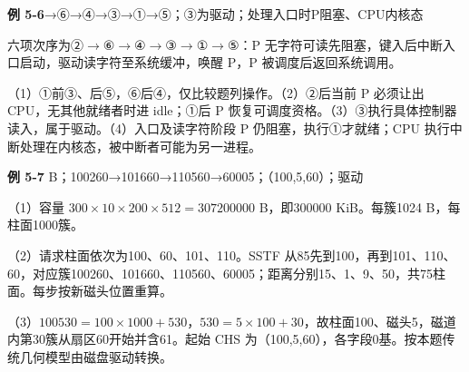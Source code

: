 \documentclass{sidenotes-simplex}
\begin{document}
\par\medskip\Needspace{30.00mm}\noindent{}\label{a:OS05-E06}\textbf{例 5-6}→{\SNsymbolfont ⑥}→{\SNsymbolfont ④}→{\SNsymbolfont ③}→{\SNsymbolfont ①}→{\SNsymbolfont ⑤}；{\SNsymbolfont ③}为驱动；处理入口时P阻塞、CPU内核态
\par\smallskip
六项次序为{\SNsymbolfont ②}\ensuremath{\to}{\SNsymbolfont ⑥}\ensuremath{\to}{\SNsymbolfont ④}\ensuremath{\to}{\SNsymbolfont ③}\ensuremath{\to}{\SNsymbolfont ①}\ensuremath{\to}{\SNsymbolfont ⑤}：P 无字符可读先阻塞，键入后中断入口启动，驱动读字符至系统缓冲，唤醒 P，P 被调度后返回系统调用。

（1）{\SNsymbolfont ①}前{\SNsymbolfont ③}、后{\SNsymbolfont ⑤}，{\SNsymbolfont ⑥}后{\SNsymbolfont ④}，仅比较题列操作。（2）{\SNsymbolfont ②}后当前 P 必须让出 CPU，无其他就绪者时进 idle；{\SNsymbolfont ①}后 P 恢复可调度资格。（3）{\SNsymbolfont ③}执行具体控制器读入，属于驱动。（4）入口及读字符阶段 P 仍阻塞，执行{\SNsymbolfont ①}才就绪；CPU 执行中断处理在内核态，被中断者可能为另一进程。

\par\medskip\Needspace{30.00mm}\noindent{}\label{a:OS05-E07}\textbf{例 5-7} B；100260→101660→110560→60005；（100,5,60）；驱动
\par\smallskip
（1）容量 \(300\times10\times200\times512=307200000\) B，即300000 KiB。每簇1024 B，每柱面1000簇。

（2）请求柱面依次为100、60、101、110。SSTF 从85先到100，再到101、110、60，对应簇100260、101660、110560、60005；距离分别15、1、9、50，共75柱面。每步按新磁头位置重算。

（3）\(100530=100\times1000+530\)，\(530=5\times100+30\)，故柱面100、磁头5，磁道内第30簇从扇区60开始并含61。起始 CHS 为（100,5,60），各字段0基。按本题传统几何模型由磁盘驱动转换。
\end{document}
